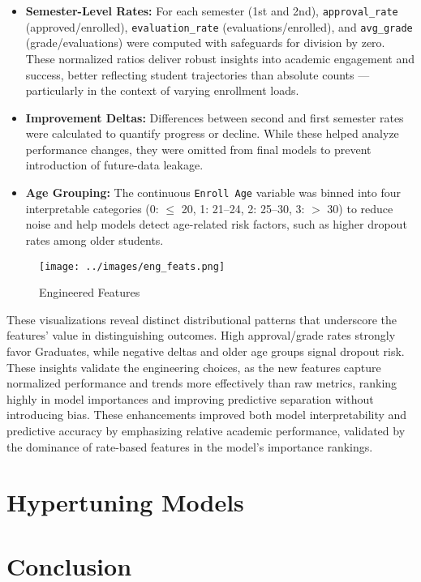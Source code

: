 \documentclass[twoside,final]{hcmut-report}
\begin{document}
\begin{itemize}
  \item \textbf{Semester-Level Rates:} For each semester (1st and 2nd), \texttt{approval\_rate} (approved/enrolled), \texttt{evaluation\_rate} (evaluations/enrolled), and \texttt{avg\_grade} (grade/evaluations) were computed with safeguards for division by zero. These normalized ratios deliver robust insights into academic engagement and success, better reflecting student trajectories than absolute counts — particularly in the context of varying enrollment loads.
  \item \textbf{Improvement Deltas:} Differences between second and first semester rates were calculated to quantify progress or decline. While these helped analyze performance changes, they were omitted from final models to prevent introduction of future-data leakage.
  \item \textbf{Age Grouping:} The continuous \texttt{Enroll Age} variable was binned into four interpretable categories (0: $\leq$ 20, 1: 21--24, 2: 25--30, 3: $>$ 30) to reduce noise and help models detect age-related risk factors, such as higher dropout rates among older students.
\end{itemize}
\begin{figure}[H]
  \centering
  \texttt{[image: ../images/eng\_feats.png]}
  \caption{Engineered Features}
  \label{eng_feats}
\end{figure}
These visualizations reveal distinct distributional patterns that underscore the features' value in distinguishing outcomes. High approval/grade rates strongly favor Graduates, while negative deltas and older age groups signal dropout risk. These insights validate the engineering choices, as the new features capture normalized performance and trends more effectively than raw metrics, ranking highly in model importances and improving predictive separation without introducing bias. These enhancements improved both model interpretability and predictive accuracy by emphasizing relative academic performance, validated by the dominance of rate-based features in the model's importance rankings.
\section{Hypertuning Models}
\newpage\section{Conclusion}
\end{document}
